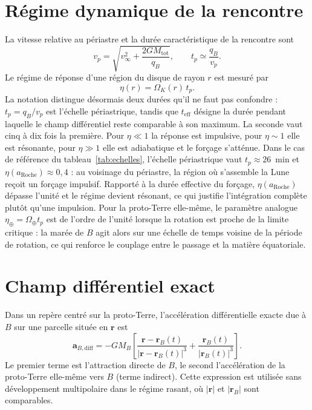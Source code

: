 \documentclass[11pt,a4paper,openany]{report}
\newcommand{\aR}{a_{\mathrm{Roche}}}
\newcommand{\Mtot}{M_{\mathrm{tot}}}
\begin{document}
\section{Régime dynamique de la rencontre}

La vitesse relative au périastre et la durée caractéristique de la rencontre sont
\begin{equation}
v_p=\sqrt{v_\infty^2+\frac{2G\Mtot}{q_B}},
\qquad
t_{p}\simeq\frac{q_B}{v_p}.
\label{eq:tenc}
\end{equation}
Le régime de réponse d'une région du disque de rayon $r$ est mesuré par
\begin{equation}
\eta(r)=\Omega_K(r)\,t_{p}.
\label{eq:eta}
\end{equation}
La notation distingue désormais deux durées qu'il ne faut pas confondre : $t_p=q_B/v_p$ est
l'échelle périastrique, tandis que $t_{\mathrm{eff}}$ désigne la durée pendant laquelle le champ
différentiel reste comparable à son maximum. La seconde vaut cinq à dix fois la première.
Pour $\eta\ll1$ la réponse est impulsive, pour $\eta\sim1$ elle est résonante, pour $\eta\gg1$
elle est adiabatique et le forçage s'atténue. Dans le cas de référence du
tableau~\ref{tab:echelles}, l'échelle périastrique vaut $t_{p}\approx26$~min et
$\eta(\aR)\approx0{,}4$ : au voisinage du périastre, la région où s'assemble la Lune reçoit un
forçage impulsif. Rapporté à la durée effective du forçage, $\eta(\aR)$ dépasse l'unité et le
régime devient résonant, ce qui justifie l'intégration complète plutôt qu'une impulsion. Pour la proto-Terre elle-même, le paramètre
analogue $\eta_\oplus=\Omega_\oplus t_{p}$ est de l'ordre de l'unité lorsque la rotation
est proche de la limite critique : la marée de $B$ agit alors sur une échelle de temps voisine de
la période de rotation, ce qui renforce le couplage entre le passage et la matière équatoriale.

\section{Champ différentiel exact}

Dans un repère centré sur la proto-Terre, l'accélération différentielle exacte due à $B$ sur une
parcelle située en $\mathbf{r}$ est
\begin{equation}
\mathbf{a}_{B,\mathrm{diff}}=-GM_B\left[
\frac{\mathbf{r}-\mathbf{r}_B(t)}{|\mathbf{r}-\mathbf{r}_B(t)|^3}
+\frac{\mathbf{r}_B(t)}{|\mathbf{r}_B(t)|^3}\right].
\label{eq:adiff}
\end{equation}
Le premier terme est l'attraction directe de $B$, le second l'accélération de la proto-Terre
elle-même vers $B$ (terme indirect). Cette expression est utilisée sans développement
multipolaire dans le régime rasant, où $|\mathbf{r}|$ et $|\mathbf{r}_B|$ sont comparables.
\end{document}
